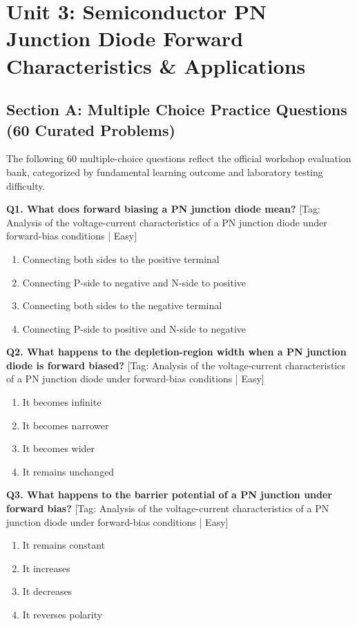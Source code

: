 \chapter{Unit 3: Semiconductor PN Junction Diode Forward Characteristics \& Applications}

\section{Section A: Multiple Choice Practice Questions (60 Curated Problems)}

\noindent The following 60 multiple-choice questions reflect the official workshop evaluation bank, categorized by fundamental learning outcome and laboratory testing difficulty.\vspace{3mm}

\noindent\textbf{Q1. What does forward biasing a PN junction diode mean?} \hfill [Tag: Analysis of the voltage-current characteristics of a PN junction diode under forward-bias conditions | Easy]
\begin{enumerate}[label=(\alph*),topsep=2pt,itemsep=1pt,partopsep=0pt,parsep=0pt]
    \item {Connecting both sides to the positive terminal}
    \item {Connecting P-side to negative and N-side to positive}
    \item {Connecting both sides to the negative terminal}
    \item {Connecting P-side to positive and N-side to negative}
\end{enumerate}
\vspace{2mm}

\noindent\textbf{Q2. What happens to the depletion-region width when a PN junction diode is forward biased?} \hfill [Tag: Analysis of the voltage-current characteristics of a PN junction diode under forward-bias conditions | Easy]
\begin{enumerate}[label=(\alph*),topsep=2pt,itemsep=1pt,partopsep=0pt,parsep=0pt]
    \item {It becomes infinite}
    \item {It becomes narrower}
    \item {It becomes wider}
    \item {It remains unchanged}
\end{enumerate}
\vspace{2mm}

\noindent\textbf{Q3. What happens to the barrier potential of a PN junction under forward bias?} \hfill [Tag: Analysis of the voltage-current characteristics of a PN junction diode under forward-bias conditions | Easy]
\begin{enumerate}[label=(\alph*),topsep=2pt,itemsep=1pt,partopsep=0pt,parsep=0pt]
    \item {It remains constant}
    \item {It increases}
    \item {It decreases}
    \item {It reverses polarity}
\end{enumerate}
\vspace{2mm}

